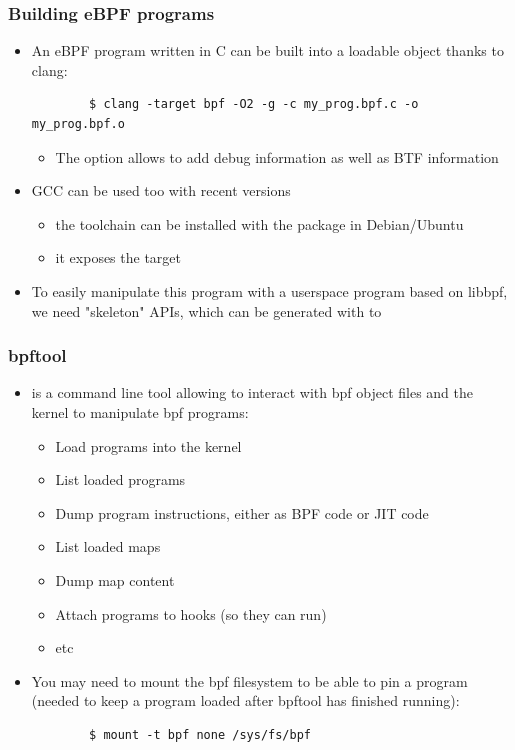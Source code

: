 \begin{frame}[fragile]
  \frametitle{Building eBPF programs}
  \begin{itemize}
    \item An eBPF program written in C can be built into a loadable object
    thanks to clang:
    \begin{block}{}
      \begin{verbatim}
        $ clang -target bpf -O2 -g -c my_prog.bpf.c -o my_prog.bpf.o
      \end{verbatim}
    \end{block}
    \begin{itemize}
        \item The  option allows to add debug information as well as
        BTF information
    \end{itemize}
    \item GCC can be used too with recent versions
    \begin{itemize}
      \item the toolchain can be installed with the  package in
      Debian/Ubuntu
      \item it exposes the  target
    \end{itemize}
    \item To easily manipulate this program with a userspace program based on libbpf,
    we need "skeleton" APIs, which can be generated with to 
  \end{itemize}
\end{frame}

\begin{frame}[fragile]
  \frametitle{bpftool}
  \begin{itemize}
    \item {} is a command line tool allowing to interact with bpf
    object files and the kernel to manipulate bpf programs:
    \begin{itemize}
      \item Load programs into the kernel
      \item List loaded programs
      \item Dump program instructions, either as BPF code or JIT code
      \item List loaded maps
      \item Dump map content
      \item Attach programs to hooks (so they can run)
      \item etc
    \end{itemize}
    \item You may need to mount the bpf filesystem to be able to pin a program
    (needed to keep a program loaded after bpftool has finished running):
    \begin{block}{}
      \begin{verbatim}
        $ mount -t bpf none /sys/fs/bpf
      \end{verbatim}
    \end{block}
  \end{itemize}
\end{frame}

